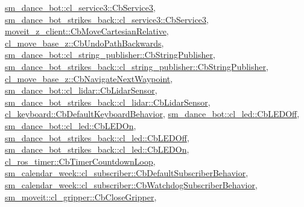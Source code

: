 \hyperlink{classsm__dance__bot_1_1cl__service3_1_1CbService3_ae9e3796b507ad96cc0890fec0f64a4b7}{sm\+\_\+dance\+\_\+bot\+::cl\+\_\+service3\+::\+Cb\+Service3}, \hyperlink{classsm__dance__bot__strikes__back_1_1cl__service3_1_1CbService3_a09a2fda38973e1e3915b63a47ca67ed1}{sm\+\_\+dance\+\_\+bot\+\_\+strikes\+\_\+back\+::cl\+\_\+service3\+::\+Cb\+Service3}, \hyperlink{classmoveit__z__client_1_1CbMoveCartesianRelative_aaea0e6c7431f93301a77269b8fa539f8}{moveit\+\_\+z\+\_\+client\+::\+Cb\+Move\+Cartesian\+Relative}, \hyperlink{classcl__move__base__z_1_1CbUndoPathBackwards_a32e680530375b62c7053bf173f6b2b1b}{cl\+\_\+move\+\_\+base\+\_\+z\+::\+Cb\+Undo\+Path\+Backwards}, \hyperlink{classsm__dance__bot_1_1cl__string__publisher_1_1CbStringPublisher_a7aa533578e820ee90d92d15b85d42e9b}{sm\+\_\+dance\+\_\+bot\+::cl\+\_\+string\+\_\+publisher\+::\+Cb\+String\+Publisher}, \hyperlink{classsm__dance__bot__strikes__back_1_1cl__string__publisher_1_1CbStringPublisher_a2c3963143fe180a5e5f939362857d2e0}{sm\+\_\+dance\+\_\+bot\+\_\+strikes\+\_\+back\+::cl\+\_\+string\+\_\+publisher\+::\+Cb\+String\+Publisher}, \hyperlink{classcl__move__base__z_1_1CbNavigateNextWaypoint_a04913ef24344363669c1916b5df28493}{cl\+\_\+move\+\_\+base\+\_\+z\+::\+Cb\+Navigate\+Next\+Waypoint}, \hyperlink{structsm__dance__bot_1_1cl__lidar_1_1CbLidarSensor_aad3468a6ae78999c9fd01bdb81b42a49}{sm\+\_\+dance\+\_\+bot\+::cl\+\_\+lidar\+::\+Cb\+Lidar\+Sensor}, \hyperlink{structsm__dance__bot__strikes__back_1_1cl__lidar_1_1CbLidarSensor_a82d0250dcf2d4e9b12ccd528a5d87002}{sm\+\_\+dance\+\_\+bot\+\_\+strikes\+\_\+back\+::cl\+\_\+lidar\+::\+Cb\+Lidar\+Sensor}, \hyperlink{classcl__keyboard_1_1CbDefaultKeyboardBehavior_a06e49d8c78aeffecf74c27b05f529a3a}{cl\+\_\+keyboard\+::\+Cb\+Default\+Keyboard\+Behavior}, \hyperlink{classsm__dance__bot_1_1cl__led_1_1CbLEDOff_a3c0ed097db52baae1928a19936f09a83}{sm\+\_\+dance\+\_\+bot\+::cl\+\_\+led\+::\+Cb\+L\+E\+D\+Off}, \hyperlink{classsm__dance__bot_1_1cl__led_1_1CbLEDOn_a3b7de8585d728becefb8c2c5cc3b6d95}{sm\+\_\+dance\+\_\+bot\+::cl\+\_\+led\+::\+Cb\+L\+E\+D\+On}, \hyperlink{classsm__dance__bot__strikes__back_1_1cl__led_1_1CbLEDOff_acde07c4940b5f210ddaa8aaac60b03c2}{sm\+\_\+dance\+\_\+bot\+\_\+strikes\+\_\+back\+::cl\+\_\+led\+::\+Cb\+L\+E\+D\+Off}, \hyperlink{classsm__dance__bot__strikes__back_1_1cl__led_1_1CbLEDOn_a49de8ffe1304efb84e10a76c4d309d89}{sm\+\_\+dance\+\_\+bot\+\_\+strikes\+\_\+back\+::cl\+\_\+led\+::\+Cb\+L\+E\+D\+On}, \hyperlink{classcl__ros__timer_1_1CbTimerCountdownLoop_aa088f15db4fb2c307c86b30b2e1f7744}{cl\+\_\+ros\+\_\+timer\+::\+Cb\+Timer\+Countdown\+Loop}, \hyperlink{classsm__calendar__week_1_1cl__subscriber_1_1CbDefaultSubscriberBehavior_ab92e1f50bb88e3b47c2ee4520fecb719}{sm\+\_\+calendar\+\_\+week\+::cl\+\_\+subscriber\+::\+Cb\+Default\+Subscriber\+Behavior}, \hyperlink{classsm__calendar__week_1_1cl__subscriber_1_1CbWatchdogSubscriberBehavior_a291895411a45ffe349a6117d51e11212}{sm\+\_\+calendar\+\_\+week\+::cl\+\_\+subscriber\+::\+Cb\+Watchdog\+Subscriber\+Behavior}, \hyperlink{classsm__moveit_1_1cl__gripper_1_1CbCloseGripper_adc772dda477c6370dc41117613e35699}{sm\+\_\+moveit\+::cl\+\_\+gripper\+::\+Cb\+Close\+Gripper}, 